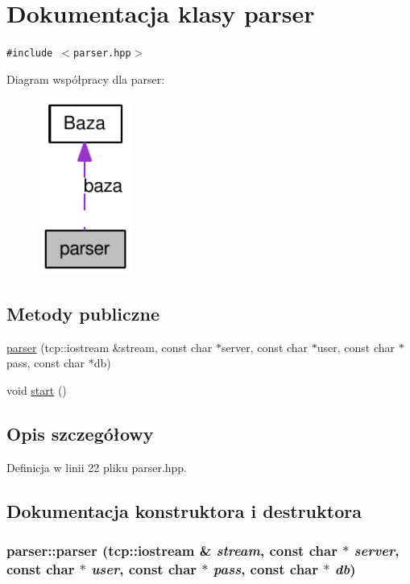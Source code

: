 \hypertarget{a00002}{
\section{Dokumentacja klasy parser}
\label{a00002}
}
{\tt \#include $<$parser.hpp$>$}

Diagram współpracy dla parser:\nopagebreak
\begin{figure}[H]
\begin{center}
\leavevmode
\includegraphics[width=86pt]{a00035}
\end{center}
\end{figure}
\subsection*{Metody publiczne}
\begin{CompactItemize}
\item 
\hyperlink{a00002_3a237071a3ab764cd61bc53df9dd4f46}{parser} (tcp::iostream \&stream, const char $\ast$server, const char $\ast$user, const char $\ast$pass, const char $\ast$db)
\item 
void \hyperlink{a00002_7793913f528921aa22c4b6cc259a0a14}{start} ()
\end{CompactItemize}


\subsection{Opis szczegółowy}


Definicja w linii 22 pliku parser.hpp.

\subsection{Dokumentacja konstruktora i destruktora}
\hypertarget{a00002_3a237071a3ab764cd61bc53df9dd4f46}{
\subsubsection[{parser}]{\setlength{\rightskip}{0pt plus 5cm}parser::parser (tcp::iostream \& {\em stream}, \/  const char $\ast$ {\em server}, \/  const char $\ast$ {\em user}, \/  const char $\ast$ {\em pass}, \/  const char $\ast$ {\em db})}}
\label{a00002_3a237071a3ab764cd61bc53df9dd4f46}




